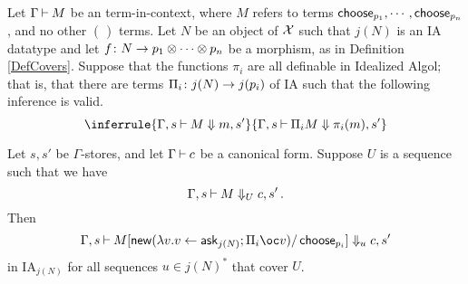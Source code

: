\documentclass{report}[11pt]
\begin{document}
\begin{lemma}
  Let $\Gamma \ts M$ be an \IAXX term-in-context, where $M$ refers to terms $\choose_{p_1},\cdots,\choose_{p_n}$, and no other $\choose$ terms.
  Let $N$ be an object of $\X$ such that $j(N)$ is an IA datatype and let $f\from N \to p_1\tensor \cdots \tensor p_n$ be a morphism, as in Definition \ref{DefCovers}.  
  Suppose that the functions $\pi_i$ are all definable in Idealized Algol; that is, that there are terms $\Pi_i\from j(N) \to j(p_i)$ of IA such that the following inference is valid.
  \[
    \inferrule{ \Gamma,s\ts M \converges m,s'}{\Gamma,s\ts \Pi_i M\converges \pi_i(m),s'}
    \]

  Let $s,s'$ be $\Gamma$-stores, and let $\Gamma\ts c$ be a canonical form.  
  Suppose $U$ is a sequence such that we have
  \[
    \Gamma,s\ts M\converges_U c,s'\,.
    \]
  Then
  \[
    \Gamma,s\ts M[\neww (\lambda v.v\gets \ask_{j(N)};\Pi_i \oc v)/\choose_{p_i}] \converges_u c,s'
    \]
  in IA${}_{j(N)}$ for all sequences $u\in j(N)^*$ that cover $U$.
  \label{LemSoundnessIaxx}
\end{lemma}
\end{document}
